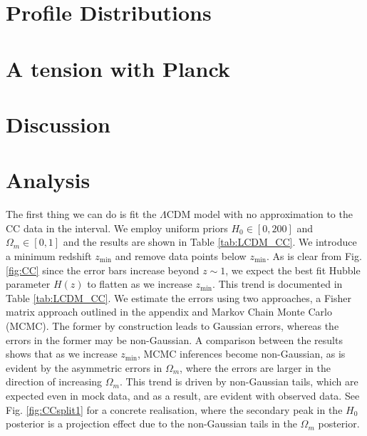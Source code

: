\documentclass[a4paper,11pt]{article}
\begin{document}
\section{Profile Distributions}

\section{A tension with Planck}

\section{Discussion}

\section{Analysis}
The first thing we can do is fit the $\Lambda$CDM model with no approximation to the CC data in the interval. We employ uniform priors $H_0 \in [0, 200]$ and $\Omega_m \in [0, 1]$ and the results are shown in Table \ref{tab:LCDM_CC}. We introduce a minimum redshift $z_{\textrm{min}}$ and remove data points below $z_{\textrm{min}}$. As is clear from Fig. \ref{fig:CC} since the error bars increase beyond $z \sim 1$, we expect the best fit Hubble parameter $H(z)$ to flatten as we increase $z_{\textrm{min}}$. This trend is documented in Table \ref{tab:LCDM_CC}. We estimate the errors using two approaches, a Fisher matrix approach outlined in the appendix and Markov Chain Monte Carlo (MCMC). The former by construction leads to Gaussian errors, whereas the errors in the former may be non-Gaussian. A comparison between the results shows that as we increase $z_{\textrm{min}}$, MCMC inferences become non-Gaussian, as is evident by the asymmetric errors in $\Omega_m$, where the errors are larger in the direction of increasing $\Omega_m$. This trend is driven by non-Gaussian tails, which are expected even in mock data, and as a result, are evident with observed data. See Fig. \ref{fig:CCsplit1} for a concrete realisation, where the secondary peak in the $H_0$ posterior is a projection effect due to the non-Gaussian tails in the $\Omega_m$ posterior.  
\end{document}
